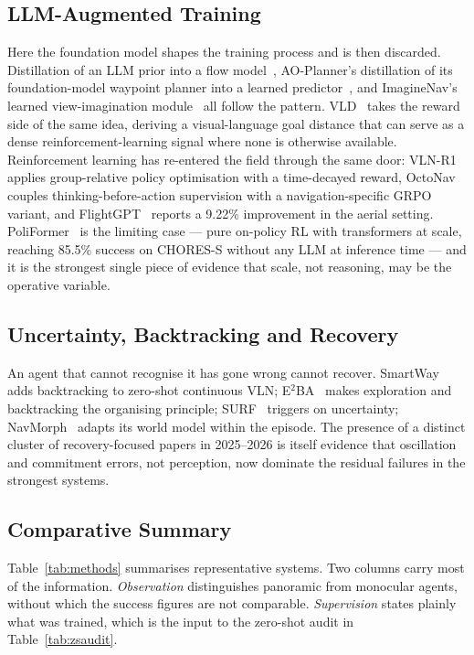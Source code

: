 \documentclass[journal]{IEEEtran}
\begin{document}
\subsection{LLM-Augmented Training}
Here the foundation model shapes the training process and is then discarded.
Distillation of an LLM prior into a flow model~\cite{li2025distilling},
AO-Planner's distillation of its foundation-model waypoint planner into a
learned predictor~\cite{chen2024affordances}, and
ImagineNav's learned view-imagination module~\cite{zhao2024imaginenav} all
follow the pattern. VLD~\cite{milikic2025visual} takes the reward side of the same idea,
deriving a visual-language goal distance that can serve as a dense
reinforcement-learning signal where none is otherwise available.
Reinforcement learning has re-entered the field through
the same door: VLN-R1~\cite{qi2025vision} applies group-relative policy
optimisation with a time-decayed reward,
OctoNav~\cite{gao2025octonav} couples thinking-before-action supervision
with a navigation-specific GRPO variant, and
FlightGPT~\cite{cai2025flightgpt} reports a 9.22\% improvement in the
aerial setting. PoliFormer~\cite{zeng2024poliformer} is the limiting case
--- pure on-policy RL with transformers at scale, reaching 85.5\% success
on CHORES-S without any LLM at inference time --- and it is the strongest
single piece of evidence that scale, not reasoning, may be the operative
variable.

\subsection{Uncertainty, Backtracking and Recovery}
An agent that cannot recognise it has gone wrong cannot recover.
SmartWay~\cite{shi2025smartway} adds backtracking to zero-shot continuous
VLN; E$^2$BA~\cite{shi2025environment} makes exploration and backtracking
the organising principle; SURF~\cite{shinnick2026surf} triggers on
uncertainty; NavMorph~\cite{yao2025navmorph} adapts its world model within
the episode. The presence of a distinct cluster of recovery-focused papers
in 2025--2026 is itself evidence that oscillation and commitment errors,
not perception, now dominate the residual failures in the strongest
systems.

\subsection{Comparative Summary}
Table~\ref{tab:methods} summarises representative systems. Two columns
carry most of the information. \emph{Observation} distinguishes panoramic
from monocular agents, without which the success figures are not
comparable. \emph{Supervision} states plainly what was trained, which is
the input to the zero-shot audit in Table~\ref{tab:zsaudit}.
\end{document}
